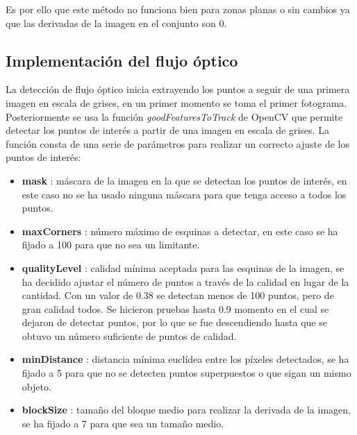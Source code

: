 \documentclass[a4paper,12pt]{article}
\begin{document}
{\vspace{0.5cm}

Es por ello que este método no funciona bien para zonas planas o sin cambios ya que las derivadas de la imagen en el conjunto son 0.

\vspace{0.5cm}

\subsection{Implementación del flujo óptico}

\vspace{0.5cm}

La detección de flujo óptico inicia extrayendo los puntos a seguir de una primera imagen en escala de grises, en un primer momento se toma el primer fotograma.
Posteriormente se usa la función \textit{goodFeaturesToTrack} de OpenCV que permite detectar los puntos de interés a partir de una imagen en escala de grises. 
La función consta de una serie de parámetros para realizar un correcto ajuste de los puntos de interés:

\vspace{0.5cm}

\begin{itemize}
  \item \textbf{mask} : máscara de la imagen en la que se detectan los puntos de interés, en este caso no se ha usado ninguna máscara para que tenga acceso a todos los puntos.
  \item \textbf{maxCorners} : número máximo de esquinas a detectar, en este caso se ha fijado a 100 para que no sea un limitante.
  \item \textbf{qualityLevel} : calidad mínima aceptada para las esquinas de la imagen, se ha decidido ajustar el número de puntos a través de la calidad en lugar de la cantidad. Con un valor de 0.38 se detectan menos de 100
  puntos, pero de gran calidad todos. Se hicieron pruebas hasta 0.9 momento en el cual se dejaron de detectar puntos, por lo que se fue descendiendo hasta que se obtuvo un número suficiente de puntos de calidad.
  \item \textbf{minDistance} : distancia mínima euclídea entre los píxeles detectados, se ha fijado a 5 para que no se detecten puntos superpuestos o que sigan un mismo objeto.
  \item \textbf{blockSize} : tamaño del bloque medio para realizar la derivada de la imagen, se ha fijado a 7 para que sea un tamaño medio.
\end{itemize}

}
\end{document}
